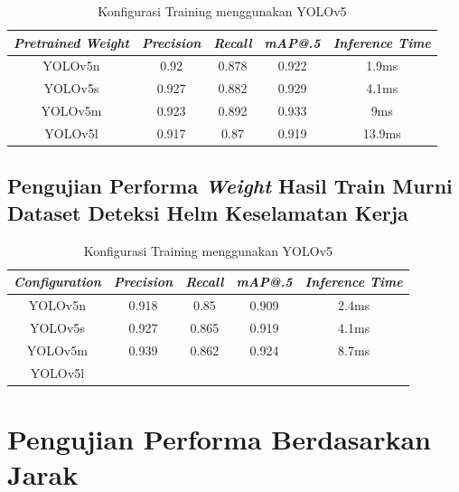 \begin{longtable}{|c|c|c|c|c|}
  \caption{Konfigurasi Training menggunakan YOLOv5}
  \label{tb:pretraincoco}\\
  \hline
  \rowcolor[HTML]{C0C0C0}
  \textbf{\emph{Pretrained Weight}} & \emph{Precision}  & \emph{Recall} & \emph{mAP@.5} & \emph{Inference Time}\\
  \hline
  YOLOv5n                           & 0.92               & 0.878         & 0.922         & 1.9ms                \\
  YOLOv5s                           & 0.927              & 0.882         & 0.929         & 4.1ms             \\
  YOLOv5m                           & 0.923             & 0.892         & 0.933        & 9ms                \\
  YOLOv5l                           & 0.917            & 0.87         & 0.919         & 13.9ms                \\
  \hline
\end{longtable}

\subsection{Pengujian Performa \emph{Weight} Hasil Train Murni Dataset Deteksi Helm Keselamatan Kerja}

\begin{longtable}{|c|c|c|c|c|}
  \caption{Konfigurasi Training menggunakan YOLOv5}
  \label{tb:nopretrain}\\
  \hline
  \rowcolor[HTML]{C0C0C0}
  \textbf{\emph{Configuration}} & \emph{Precision}  & \emph{Recall} & \emph{mAP@.5} & \emph{Inference Time}\\
  \hline
  YOLOv5n                           & 0.918              & 0.85         & 0.909         & 2.4ms                \\
  YOLOv5s                           & 0.927             & 0.865        & 0.919        & 4.1ms               \\
  YOLOv5m                           & 0.939            & 0.862        & 0.924        & 8.7ms                \\
  YOLOv5l                           &                   &             &               &                \\
  \hline
\end{longtable}

\section{Pengujian Performa Berdasarkan Jarak}

